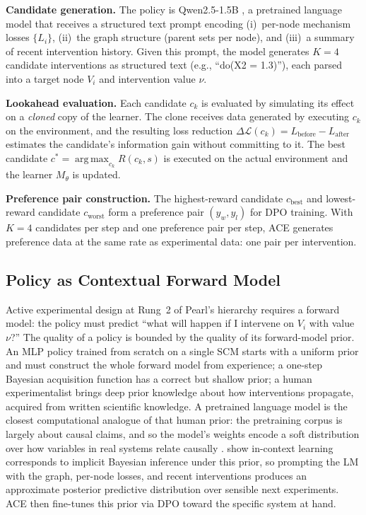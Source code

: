 \documentclass{article}
\DeclareMathOperator*{\argmax}{arg\,max}
\theoremstyle{plain}
\theoremstyle{definition}
\theoremstyle{remark}
\begin{document}
\textbf{Candidate generation.} The policy is Qwen2.5-1.5B \citep{qwen2_5}, a pretrained language model that receives a structured text prompt encoding (i)~per-node mechanism losses $\{L_i\}$, (ii)~the graph structure (parent sets per node), and (iii)~a summary of recent intervention history. Given this prompt, the model generates $K=4$ candidate interventions as structured text (e.g., ``do(X2 = 1.3)''), each parsed into a target node $V_i$ and intervention value $\nu$.

\textbf{Lookahead evaluation.} Each candidate $c_k$ is evaluated by simulating its effect on a \emph{cloned} copy of the learner. The clone receives data generated by executing $c_k$ on the environment, and the resulting loss reduction $\Delta\mathcal{L}(c_k) = L_\text{before} - L_\text{after}$ estimates the candidate's information gain without committing to it. The best candidate $c^* = \argmax_{c_k} R(c_k, s)$ is executed on the actual environment and the learner $M_\theta$ is updated.

\textbf{Preference pair construction.} The highest-reward candidate $c_\text{best}$ and lowest-reward candidate $c_\text{worst}$ form a preference pair $(y_w, y_l)$ for DPO training. With $K=4$ candidates per step and one preference pair per step, ACE generates preference data at the same rate as experimental data: one pair per intervention.

\subsection{Policy as Contextual Forward Model}
\label{sec:lm-policy}

Active experimental design at Rung~2 of Pearl's hierarchy requires a forward model: the policy must predict ``what will happen if I intervene on $V_i$ with value $\nu$?'' The quality of a policy is bounded by the quality of its forward-model prior. An MLP policy trained from scratch on a single SCM starts with a uniform prior and must construct the whole forward model from experience; a one-step Bayesian acquisition function has a correct but shallow prior; a human experimentalist brings deep prior knowledge about how interventions propagate, acquired from written scientific knowledge. A pretrained language model is the closest computational analogue of that human prior: the pretraining corpus is largely about causal claims, and so the model's weights encode a soft distribution over how variables in real systems relate causally \citep{hao2023reasoning,kiciman2023causal}. \citet{xie2022explanation} show in-context learning corresponds to implicit Bayesian inference under this prior, so prompting the LM with the graph, per-node losses, and recent interventions produces an approximate posterior predictive distribution over sensible next experiments. ACE then fine-tunes this prior via DPO toward the specific system at hand.
\end{document}
